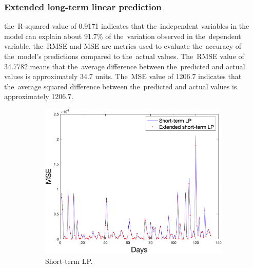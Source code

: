     \subsubsection{Extended long-term linear prediction} \label{subsec:res_eltlp}
     the~R-squared value of 0.9171 indicates that the~independent variables in the
    model can explain about 91.7\% of the~variation observed in the~dependent variable.
     the~RMSE and MSE are metrics used to evaluate the~accuracy of the~model's predictions
    compared to the~actual values. The~RMSE value of 34.7782 means that the~average difference
    between the~predicted and actual values is approximately 34.7 units. The~MSE value of
    1206.7 indicates that the~average squared difference between the~predicted and actual
    values is approximately 1206.7.\\
    \begin{figure}[!ht]
        \centering
        \begin{subfigure}[b]{0.4\textwidth}
            \includegraphics[width=1\textwidth]{figures/mseLP.png}
            \caption{Short-term LP.}
            \label{fig:mselp}
        \end{subfigure}
        \hspace{0.1\textwidth}
        \begin{subfigure}[b]{0.4\textwidth}

\end{subfigure}
\end{figure}
